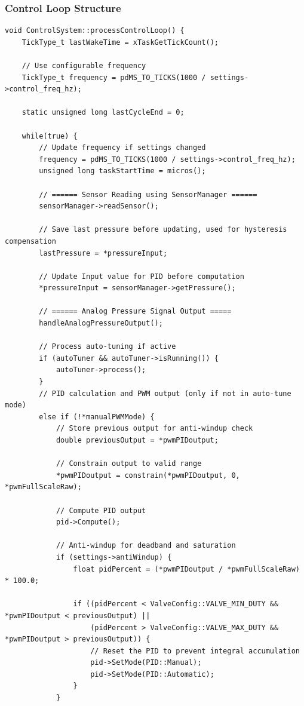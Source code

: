 \subsubsection{Control Loop Structure}
\begin{lstlisting}[caption=Control Loop Implementation - Actual Code from ControlSystem.cpp]
void ControlSystem::processControlLoop() {
    TickType_t lastWakeTime = xTaskGetTickCount();
    
    // Use configurable frequency
    TickType_t frequency = pdMS_TO_TICKS(1000 / settings->control_freq_hz);
    
    static unsigned long lastCycleEnd = 0;
    
    while(true) {
        // Update frequency if settings changed
        frequency = pdMS_TO_TICKS(1000 / settings->control_freq_hz);
        unsigned long taskStartTime = micros();
        
        // ====== Sensor Reading using SensorManager ======
        sensorManager->readSensor();
        
        // Save last pressure before updating, used for hysteresis compensation
        lastPressure = *pressureInput;
        
        // Update Input value for PID before computation
        *pressureInput = sensorManager->getPressure();
        
        // ====== Analog Pressure Signal Output =====
        handleAnalogPressureOutput();
        
        // Process auto-tuning if active
        if (autoTuner && autoTuner->isRunning()) {
            autoTuner->process();
        }
        // PID calculation and PWM output (only if not in auto-tune mode)
        else if (!*manualPWMMode) {
            // Store previous output for anti-windup check
            double previousOutput = *pwmPIDoutput;
            
            // Constrain output to valid range
            *pwmPIDoutput = constrain(*pwmPIDoutput, 0, *pwmFullScaleRaw); 

            // Compute PID output
            pid->Compute();
            
            // Anti-windup for deadband and saturation
            if (settings->antiWindup) {
                float pidPercent = (*pwmPIDoutput / *pwmFullScaleRaw) * 100.0;
                
                if ((pidPercent < ValveConfig::VALVE_MIN_DUTY && *pwmPIDoutput < previousOutput) ||
                    (pidPercent > ValveConfig::VALVE_MAX_DUTY && *pwmPIDoutput > previousOutput)) {
                    // Reset the PID to prevent integral accumulation
                    pid->SetMode(PID::Manual);
                    pid->SetMode(PID::Automatic);
                }
            }
            

\end{lstlisting}
